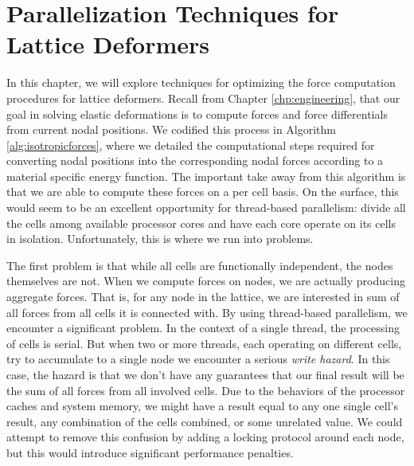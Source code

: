 \chapter{Parallelization Techniques for Lattice Deformers}
\label{chp:parallelization}

In this chapter, we will explore techniques for optimizing the force
computation procedures for lattice deformers. Recall from Chapter
\ref{chp:engineering}, that our goal in solving elastic deformations
is to compute forces and force differentials from current nodal
positions. We codified this process in Algorithm
\ref{alg:isotropicforces}, where we detailed the computational steps
required for converting nodal positions into the corresponding nodal
forces according to a material specific energy function. The important
take away from this algorithm is that we are able to compute these
forces on a per cell basis. On the surface, this would seem to be an
excellent opportunity for thread-based parallelism: divide all the
cells among available processor cores and have each core operate on
its cells in isolation. Unfortunately, this is where we run into
problems.

The first problem is that while all cells are functionally
independent, the nodes themselves are not. When we compute forces on
nodes, we are actually producing aggregate forces. That is, for any
node in the lattice, we are interested in sum of all forces from all
cells it is connected with. By using thread-based parallelism, we
encounter a significant problem.  In the context of a single thread,
the processing of cells is serial. But when two or more threads, each
operating on different cells, try to accumulate to a single node we
encounter a serious \textit{write hazard}. In this case, the hazard is
that we don't have any guarantees that our final result will be the
sum of all forces from all involved cells. Due to the behaviors of the
processor caches and system memory, we might have a result equal to
any one single cell's result, any combination of the cells combined,
or some unrelated value. We could attempt to remove this confusion by
adding a locking protocol around each node, but this would introduce
significant performance penalties.

